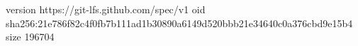 version https://git-lfs.github.com/spec/v1
oid sha256:21e786f82c4f0fb7b111ad1b30890a6149d520bbb21e34640c0a376cbd9e15b4
size 196704
